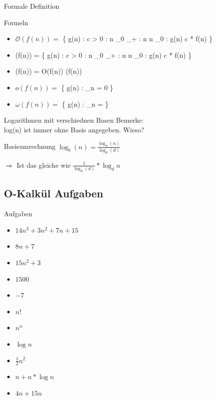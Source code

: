\documentclass[18pt]{beamer}
\begin{document}
	\begin{frame}{Formale Definition}
				
		\begin{block} {Formeln}	
			\begin{itemize}
				\item{$\mathcal{O}(f(n)) = $ \{ g(n) : \exists c >  0 : \exists  n _{0} \in {} _{+} : \all n \geq n _{0} : g(n) \leq c * f(n) \}}

				\item{\Omega(f(n)) = \{ g(n) : \exists c >  0 : \exists  n _{0} \in {} _{+} : \all n \geq n _{0} : g(n) \leq c * f(n) \}}

				\item{\Theta(f(n)) = O(f(n))   \cap   \Omega(f(n))}
			
				\item{$o(f(n)) = $ \{ g(n) : \lim _{n \to \infty}  = 0 \}}

				\item{$\omega(f(n)) = $ \{ g(n) : \lim _{n \to \infty}  = \infty \}}

			\end{itemize}			
		\end{block}	

	\end{frame}

	\begin{frame}{Logarithmen mit verschiednen Basen}
		Bemerke: \\
		log(n) ist immer ohne Basis angegeben. Wieso?

		\begin{block} {Basisumrechnung}
			$ \log _{b} (n) = \frac{\log _{d} (n)}{\log _{d}(d)} $
		\end{block}

		\centerline{$\Rightarrow$ Ist das gleiche wie $ \frac{1}{\log _{d}(d)} * \log _{d} n $}
	\end{frame}

	\subsection{O-Kalkül Aufgaben}

	\begin{frame}{Aufgaben}
		\begin{itemize}
			\item $ 14 n ^{3} + 3 n ^{2}  + 7n + 15$
			\item $ 8 n + 7 $
			\item $ 15 n ^{2} + 3 $
			\item $ 1500 $
			\item $ -7 $
			\item $ n! $
			\item $ n ^{n} $
			\item $ \log{n} $
			\item $ \frac{1}{2} n ^{2} $
			\item $ n + n * \log{n} $
			\item $ 4 n + 15 n $	
		\end{itemize}	
	\end{frame}
\end{document}
